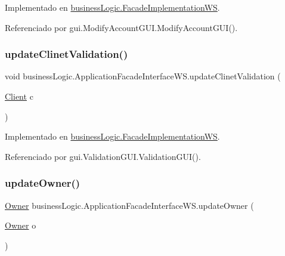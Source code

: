 Implementado en \mbox{\hyperlink{classbusiness_logic_1_1_facade_implementation_w_s_a5918c2957b02255254ae252aabfe3fc1}{business\+Logic.\+Facade\+Implementation\+WS}}.



Referenciado por gui.\+Modify\+Account\+G\+U\+I.\+Modify\+Account\+G\+U\+I().

\mbox{\label{interfacebusiness_logic_1_1_application_facade_interface_w_s_a482571287e471d0047bc24150f716d72}} 
\subsubsection{\texorpdfstring{updateClinetValidation()}{updateClinetValidation()}}
{\footnotesize\ttfamily void business\+Logic.\+Application\+Facade\+Interface\+W\+S.\+update\+Clinet\+Validation (\begin{DoxyParamCaption}\item[{\mbox{\hyperlink{classdomain_1_1_client}{Client}}}]{c }\end{DoxyParamCaption})}



Implementado en \mbox{\hyperlink{classbusiness_logic_1_1_facade_implementation_w_s_aa1ef9c26fc3278ef6c4170094ed6dcaa}{business\+Logic.\+Facade\+Implementation\+WS}}.



Referenciado por gui.\+Validation\+G\+U\+I.\+Validation\+G\+U\+I().

\mbox{\label{interfacebusiness_logic_1_1_application_facade_interface_w_s_af0ef759ffef69a39428870eada0221cd}} 
\subsubsection{\texorpdfstring{updateOwner()}{updateOwner()}}
{\footnotesize\ttfamily \mbox{\hyperlink{classdomain_1_1_owner}{Owner}} business\+Logic.\+Application\+Facade\+Interface\+W\+S.\+update\+Owner (\begin{DoxyParamCaption}\item[{\mbox{\hyperlink{classdomain_1_1_owner}{Owner}}}]{o }\end{DoxyParamCaption})}



